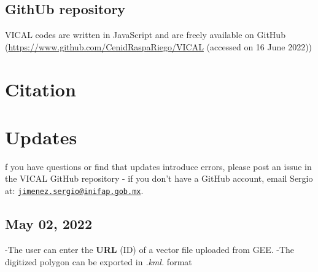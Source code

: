 \documentclass[
]{book}
\begin{document}
\hypertarget{github-repository}{%
\section{GithUb repository}\label{github-repository}}

VICAL codes are written in JavaScript and are freely available on GitHub (\url{https://www.github.com/CenidRaspaRiego/VICAL} (accessed on 16 June 2022))

\hypertarget{citation}{%
\chapter{Citation}\label{citation}}

\hypertarget{updates}{%
\chapter{Updates}\label{updates}}

f you have questions or find that updates introduce errors, please post an issue in the VICAL GitHub repository - if you don't have a GitHub account, email Sergio at: \href{mailto:jimenez.sergio@inifap.gob.mx}{\nolinkurl{jimenez.sergio@inifap.gob.mx}}.

\hypertarget{may-02-2022}{%
\section{May 02, 2022}\label{may-02-2022}}

-The user can enter the \textbf{URL} (ID) of a vector file uploaded from GEE.
-The digitized polygon can be exported in \emph{.kml.} format

  
\end{document}
